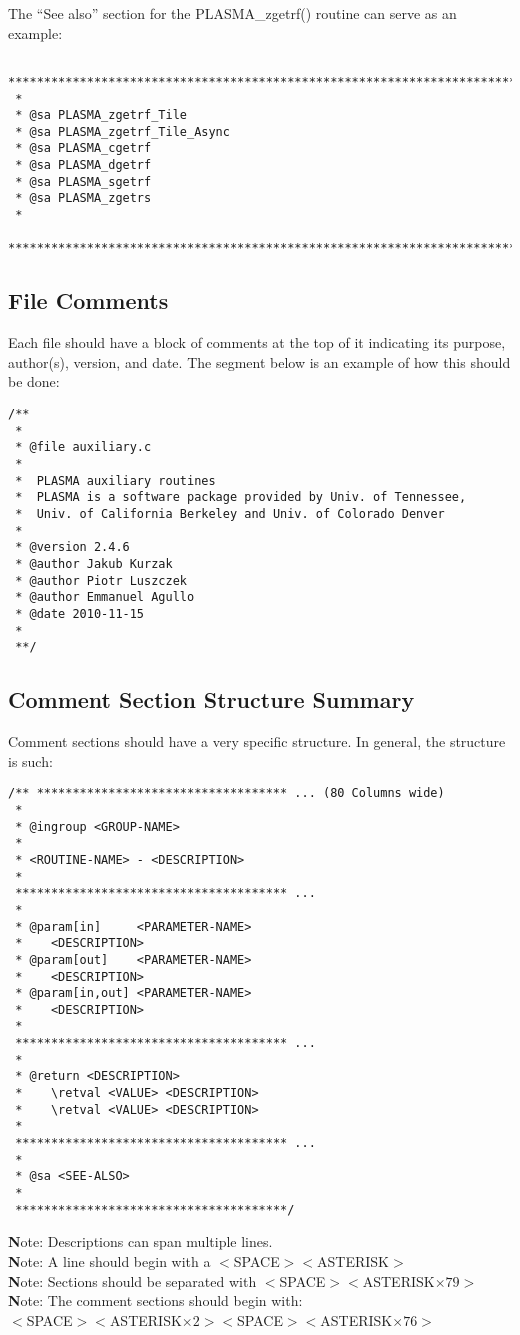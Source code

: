 The ``See also'' section for the PLASMA\_zgetrf() routine can serve as an example:
\begin{verbatim}
 *******************************************************************************
 *
 * @sa PLASMA_zgetrf_Tile
 * @sa PLASMA_zgetrf_Tile_Async
 * @sa PLASMA_cgetrf
 * @sa PLASMA_dgetrf
 * @sa PLASMA_sgetrf
 * @sa PLASMA_zgetrs
 *
 ******************************************************************************/
\end{verbatim}

\subsection{File Comments}
Each file should have a block of comments at the top of it indicating its purpose, author(s), version, and date.  The segment below is an example of how this should be done:
\begin{verbatim}
/**
 *
 * @file auxiliary.c
 *
 *  PLASMA auxiliary routines
 *  PLASMA is a software package provided by Univ. of Tennessee,
 *  Univ. of California Berkeley and Univ. of Colorado Denver
 *
 * @version 2.4.6
 * @author Jakub Kurzak
 * @author Piotr Luszczek
 * @author Emmanuel Agullo
 * @date 2010-11-15
 *
 **/
\end{verbatim}

\pagebreak
\subsection{Comment Section Structure Summary}
\label{comments:summary}
Comment sections should have a very specific structure. In general, the structure is such:
\begin{verbatim}
/** *********************************** ... (80 Columns wide)
 *
 * @ingroup <GROUP-NAME>
 *
 * <ROUTINE-NAME> - <DESCRIPTION>
 *
 ************************************** ...
 *
 * @param[in]     <PARAMETER-NAME>
 *    <DESCRIPTION>
 * @param[out]    <PARAMETER-NAME>
 *    <DESCRIPTION>
 * @param[in,out] <PARAMETER-NAME>
 *    <DESCRIPTION>
 *
 ************************************** ...
 *
 * @return <DESCRIPTION>
 *    \retval <VALUE> <DESCRIPTION>
 *    \retval <VALUE> <DESCRIPTION>     
 *
 ************************************** ...
 *
 * @sa <SEE-ALSO>
 *
 **************************************/
\end{verbatim}

{\textbf Note:} Descriptions can span multiple lines. \\
{\textbf Note:} A line should begin with a $<$SPACE$><$ASTERISK$>$ \\
{\textbf Note:} Sections should be separated with $<$SPACE$><$ASTERISK$\times 79>$ \\
{\textbf Note:} The comment sections should begin with: \\
$<$SPACE$><$ASTERISK$\times 2><$SPACE$><$ASTERISK$\times 76>$

